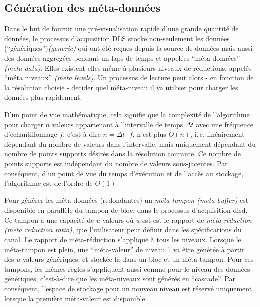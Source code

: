 \documentclass[a4paper,12pt,BCOR6mm,bibtotoc,idxtotoc]{scrbook}
\begin{document}

\subsection{G\'en\'eration des m\'eta-donn\'ees}
\label{sec:dlsd_data_meta}

Dans le but de fournir une pr\'e-visualisation rapide d'une grande
quantit\'e de donn\'ees, le processus d'acquisition DLS stocke non-seulement
 les donn\'ees (``g\'en\'eriques'')\textit{(generic)} qui ont
\'et\'e re\c cues depuis la source de donn\'ees mais aussi des
donn\'ees aggr\'eg\'ees pendant un laps de temps et appel\'ees
``m\'eta-donn\'ees'' \textit{(meta data)}. Elles
existent elles-m\^eme \`a plusieurs niveaux de r\'eductions, appel\'es
``m\'eta niveaux'' \textit{(meta levels)}.  Un processus de
lecture peut alors - en fonction de la r\'esolution choisie -
decider quel m\'eta-niveau il va utiliser pour charger les donn\'ees
plus rapidement.

D'un point de vue math\'ematique, cela signifie que la complexit\'e de
l'algorithme pour charger $n$ valeurs appartenant \`a l'intervalle de
temps $\Delta t$ avec une fr\'equence d'\'echantillonnage $f$,
c'est-\`a-dire $n = \Delta t \cdot f$, n'est plus $O(n)$,
i.\,e. lin\'eairement d\'ependant du nombre de valeurs dans
l'intervalle, mais uniquement d\'ependant du nombre de points supports
d\'esir\'es dans la r\'esolution courante. Ce nombre de points
supports est ind\'ependant du nombre de valeurs sous-jacentes. Par
cons\'equent, d'un point de vue du temps d'ex\'ecution et de l'acc\`es
au stockage, l'algorithme est de l'ordre de $O(1)$.


Pour g\'en\'erer les m\'eta-donn\'ees (redondantes) un
\textit{m\'eta-tampon (meta buffer)} est disponible en parall\`ele du
tampon de bloc, dans le processus d'acquisition dlsd.  Ce tampon a
une capacit\'e de $u$ valeurs o\`u $u$ est est le rapport de
\textit{m\'eta-r\'eduction (meta reduction ratio)}, que l'utilisateur peut d\'efinir dans les
sp\'ecifications du canal.  Le rapport de m\'eta-r\'eduction
s'applique \`a tous les niveaux.  Lorsque le m\'eta-tampon est plein,
une ``m\'eta-valeur'' de niveau 1 va \^etre g\'en\'er\'ee \`a partir
des $u$ valeurs g\'en\'eriques, et stock\'ee l\`a dans un bloc et un
m\'eta-tampon.  Pour ces tampons, les m\^emes r\`egles s'appliquent
aussi comme pour le niveau des donn\'ees g\'en\'eriques,
c'est-\`a-dire que les m\'eta-niveaux sont g\'en\'er\'es en
``cascade''.  Par cons\'equent, l'espace de stockage pour un nouveau
niveau est r\'eserv\'e uniquement lorsque la premi\`ere m\'eta-valeur
est disponible.
\end{document}

